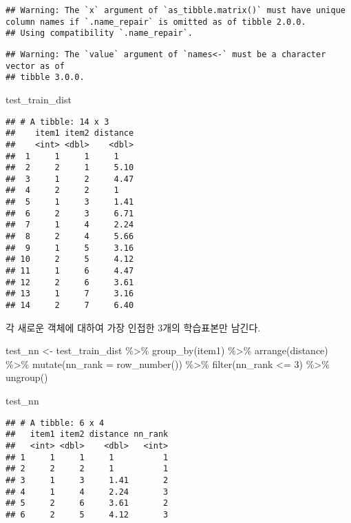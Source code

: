 \documentclass[
]{book}
\newenvironment{Shaded}{\begin{snugshade}}{\end{snugshade}}
\newcommand{\AttributeTok}[1]{\textcolor[rgb]{0.77,0.63,0.00}{#1}}
\newcommand{\DecValTok}[1]{\textcolor[rgb]{0.00,0.00,0.81}{#1}}
\newcommand{\FunctionTok}[1]{\textcolor[rgb]{0.00,0.00,0.00}{#1}}
\newcommand{\NormalTok}[1]{#1}
\newcommand{\OtherTok}[1]{\textcolor[rgb]{0.56,0.35,0.01}{#1}}
\newcommand{\SpecialCharTok}[1]{\textcolor[rgb]{0.00,0.00,0.00}{#1}}
\begin{document}
\begin{verbatim}
## Warning: The `x` argument of `as_tibble.matrix()` must have unique column names if `.name_repair` is omitted as of tibble 2.0.0.
## Using compatibility `.name_repair`.
\end{verbatim}

\begin{verbatim}
## Warning: The `value` argument of `names<-` must be a character vector as of
## tibble 3.0.0.
\end{verbatim}

\begin{Shaded}
\begin{Highlighting}[]
\NormalTok{test\_train\_dist}
\end{Highlighting}
\end{Shaded}

\begin{verbatim}
## # A tibble: 14 x 3
##    item1 item2 distance
##    <int> <dbl>    <dbl>
##  1     1     1     1   
##  2     2     1     5.10
##  3     1     2     4.47
##  4     2     2     1   
##  5     1     3     1.41
##  6     2     3     6.71
##  7     1     4     2.24
##  8     2     4     5.66
##  9     1     5     3.16
## 10     2     5     4.12
## 11     1     6     4.47
## 12     2     6     3.61
## 13     1     7     3.16
## 14     2     7     6.40
\end{verbatim}

각 새로운 객체에 대하여 가장 인접한 3개의 학습표본만 남긴다.

\begin{Shaded}
\begin{Highlighting}[]
\NormalTok{test\_nn }\OtherTok{\textless{}{-}}\NormalTok{ test\_train\_dist }\SpecialCharTok{\%\textgreater{}\%}
  \FunctionTok{group\_by}\NormalTok{(item1) }\SpecialCharTok{\%\textgreater{}\%}
  \FunctionTok{arrange}\NormalTok{(distance) }\SpecialCharTok{\%\textgreater{}\%}
  \FunctionTok{mutate}\NormalTok{(}\AttributeTok{nn\_rank =} \FunctionTok{row\_number}\NormalTok{()) }\SpecialCharTok{\%\textgreater{}\%}
  \FunctionTok{filter}\NormalTok{(nn\_rank }\SpecialCharTok{\textless{}=} \DecValTok{3}\NormalTok{) }\SpecialCharTok{\%\textgreater{}\%}
  \FunctionTok{ungroup}\NormalTok{()}

\NormalTok{test\_nn}
\end{Highlighting}
\end{Shaded}

\begin{verbatim}
## # A tibble: 6 x 4
##   item1 item2 distance nn_rank
##   <int> <dbl>    <dbl>   <int>
## 1     1     1     1          1
## 2     2     2     1          1
## 3     1     3     1.41       2
## 4     1     4     2.24       3
## 5     2     6     3.61       2
## 6     2     5     4.12       3
\end{verbatim}
\end{document}
